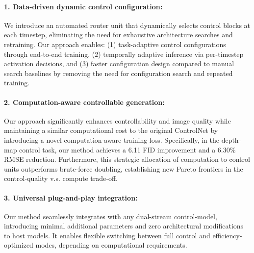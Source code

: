 \paragraph{1. Data-driven dynamic control configuration:
} We introduce an automated router unit that dynamically selects control blocks at each timestep, eliminating the need for exhaustive architecture searches and retraining. Our approach enables: (1) task-adaptive control configurations through end-to-end training, (2) temporally adaptive inference via per-timestep activation decisions, and (3) faster configuration design compared to manual search baselines by removing the need for configuration search and repeated training.
\paragraph{2. Computation-aware controllable generation:} Our approach significantly enhances controllability and image quality while maintaining a similar computational cost to the original ControlNet by introducing a novel computation-aware training loss. Specifically, in the depth-map control task, our method achieves a 6.11 FID improvement and a 6.30\% RMSE reduction. Furthermore, this strategic allocation of computation to control units outperforms brute-force doubling, establishing new Pareto frontiers in the control-quality v.s. compute trade-off.
\paragraph{3. Universal plug-and-play integration:} Our method seamlessly integrates with any dual-stream control-model, introducing minimal additional parameters and zero architectural modifications to host models. It enables flexible switching between full control and efficiency-optimized modes, depending on computational requirements.
